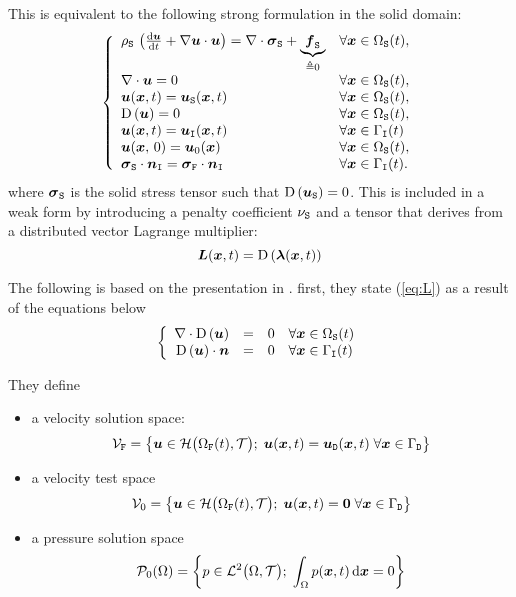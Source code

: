 \documentclass[10pt,a4paper]{article}
\begin{document}
This is equivalent to the following strong formulation in the solid domain:
\begin{equation}
\left\{
\begin{array}{ll}
\rhos\,\left(\dt{\vu} + \grad \vu\cdot \vu \right)= \div \vsigmas + \underbrace{\vf_\labs}_{\triangleq 0} & \forall \vx \in \doms(t),\\
\div \vu = 0 & \forall \vx \in \doms(t), \\
\vu(\vx, t) = \vus(\vx, t) & \forall \vx \in \doms(t), \\
\D{\vu} = 0 & \forall \vx \in \doms(t), \\
\vu(\vx,t)=\vui(\vx,t) & \forall \vx \in \boui(t) \\
\vu(\vx, \,0) = \vu_{\mathrm{0}}(\vx) & \forall \vx \in \doms(t), \\
\vsigmas\cdot \vn_{\labi} = \vsigmaf\cdot \vn_{\labi} & \forall \vx \in \boui(t).
\end{array}
\right.
\end{equation}
where $\vsigmas$ is the solid stress tensor such that $\D{\vus}=0$. This is included in a weak form by introducing a penalty coefficient $\nus$ and a tensor that derives from a distributed vector Lagrange multiplier:
\begin{equation}
\label{eq:L}
\vec L(\vx, t) = \D{\vlambda(\vx, t)}
\end{equation}


The following is based on the presentation in \cite[]{patankar2000new}. first, they state (\ref{eq:L}) as a result of the equations below
\begin{eqnarray}
\label{eq:L_constraints}
\left\{ 
\begin{array}{rcll}
\div {\D \vu} &=& 0 &\forall \vx \in \doms(t) \\
\D \vu \cdot \vec n &=& 0 &\forall \vx \in \boui(t)
\end{array}
\right.
\end{eqnarray}



They define
\begin{itemize}
\item a velocity solution space: 
$$\sVf = \left\{\vu \in \sH\big(\domf(t), \sT\big);\;\vu(\vx, t) = \vud(\vx, t)\; \forall \vx \in \boud \right\}$$
\item a velocity test space 
$$\sV_0 = \left\{\vu \in \sH\big(\domf(t), \sT\big);\;\vu(\vx, t) = \vec 0 \; \forall \vx \in \boud \right\}$$
\item a pressure solution space
$$\sP_0(\dom) = \left\{p \in \sL^2\big(\dom, \sT\big);\; \int_{\dom}p(\vx, t) \,\d\vx = 0 \right\}$$
\end{itemize}
\end{document}
